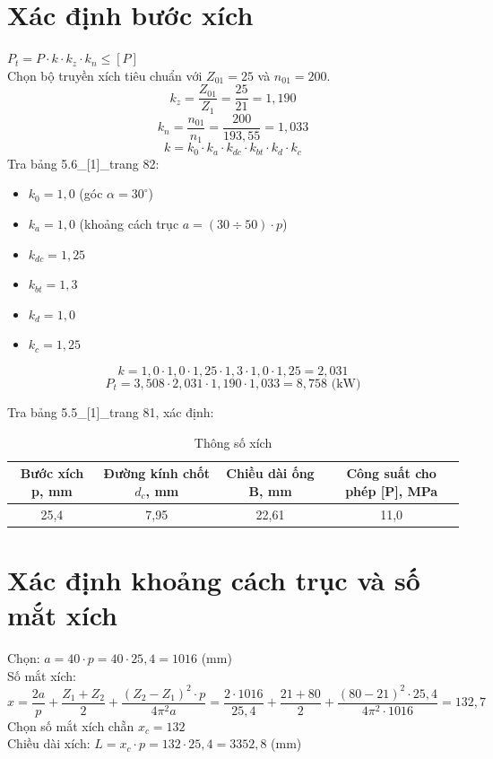 \documentclass[12pt,a4paper]{report}
\begin{document}
\section{Xác định bước xích}
$P_t = P \cdot k \cdot k_z \cdot k_n \leq [P]$\\
Chọn bộ truyền xích tiêu chuẩn với $Z_{01}=25$ và $n_{01}=200$.
$$k_z = \frac{Z_{01}}{Z_1} = \frac{25}{21} = 1{,}190$$
$$k_n = \frac{n_{01}}{n_1} = \frac{200}{193{,}55} = 1{,}033$$
$$k = k_0 \cdot k_a \cdot k_{dc} \cdot k_{bt} \cdot k_d \cdot k_c$$
Tra bảng 5.6\_[1]\_trang 82:
\begin{itemize}
    \item $k_0 = 1{,}0$ (góc $\alpha = 30^\circ$)
    \item $k_a = 1{,}0$ (khoảng cách trục $a = (30 \div 50) \cdot p$)
    \item $k_{dc} = 1{,}25$
    \item $k_{bt} = 1{,}3$
    \item $k_d = 1{,}0$
    \item $k_c = 1{,}25$
\end{itemize}
$$k = 1{,}0 \cdot 1{,}0 \cdot 1{,}25 \cdot 1{,}3 \cdot 1{,}0 \cdot 1{,}25 = 2{,}031$$
$$P_t = 3{,}508 \cdot 2{,}031 \cdot 1{,}190 \cdot 1{,}033 = 8{,}758 \text{ (kW)}$$

Tra bảng 5.5\_[1]\_trang 81, xác định:
\begin{table}[H]
    \centering
    \caption{Thông số xích}
    \begin{tabular}{|c|c|c|c|}
        \hline
        Bước xích p, mm & Đường kính chốt $d_c$, mm & Chiều dài ống B, mm & Công suất cho phép [P], MPa \\
        \hline
        25,4 & 7,95 & 22,61 & 11,0 \\
        \hline
    \end{tabular}
\end{table}

\section{Xác định khoảng cách trục và số mắt xích}
Chọn: $a = 40 \cdot p = 40 \cdot 25{,}4 = 1016$ (mm)\\
Số mắt xích:
$$x = \frac{2a}{p} + \frac{Z_1 + Z_2}{2} + \frac{(Z_2 - Z_1)^2 \cdot p}{4\pi^2 a} = \frac{2 \cdot 1016}{25{,}4} + \frac{21+80}{2} + \frac{(80-21)^2 \cdot 25{,}4}{4\pi^2 \cdot 1016} = 132{,}7$$
Chọn số mắt xích chẵn $x_c = 132$\\
Chiều dài xích: $L = x_c \cdot p = 132 \cdot 25{,}4 = 3352{,}8$ (mm)
\end{document}
